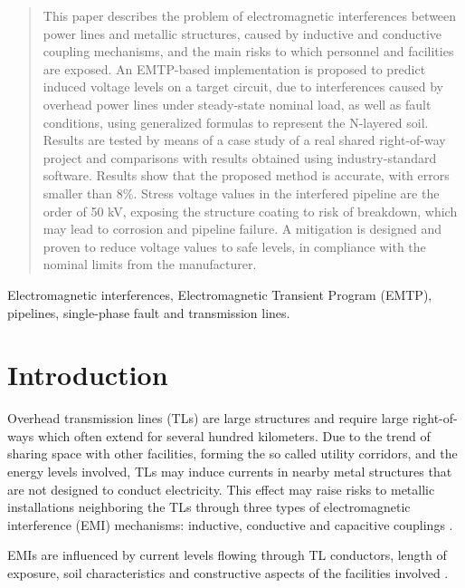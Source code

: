 \documentclass{IEEEtran4PSCC}
\begin{document}
\begin{abstract}
This paper describes the problem of electromagnetic interferences between power lines and metallic structures, caused by inductive and conductive coupling mechanisms, and the main risks to which personnel and facilities are exposed. An EMTP-based implementation is proposed to predict induced voltage levels on a target circuit, due to interferences caused by overhead power lines under steady-state nominal load, as well as fault conditions, using generalized formulas to represent the N-layered soil. Results are tested by means of a case study of a real shared right-of-way project and comparisons with results obtained using industry-standard software. Results show that the proposed method is accurate, with errors smaller than 8\%. Stress voltage values in the interfered pipeline are the order of 50 kV, exposing the structure  coating to risk of breakdown, which may lead to corrosion and pipeline failure. A mitigation is designed and proven to reduce voltage values to safe levels, in compliance with the nominal limits from the manufacturer.
\end{abstract}

\begin{IEEEkeywords}
Electromagnetic interferences, Electromagnetic Transient Program (EMTP), pipelines, single-phase fault and transmission lines.
\end{IEEEkeywords}





\section{Introduction}


Overhead transmission lines (TLs) are large structures and
require large right-of-ways which often extend for several hundred kilometers. Due to the trend of sharing space with other facilities, forming the so called utility corridors, and the energy levels involved,  TLs may induce currents in nearby metal structures that are not designed to conduct electricity. This effect may raise risks to metallic installations neighboring the TLs through three types of electromagnetic interference (EMI) mechanisms: inductive, conductive and capacitive couplings \cite{CIGREWG36}.

EMIs are influenced by current levels flowing through TL conductors, length of exposure, soil characteristics and constructive aspects of the facilities involved \cite{CIGREWG36}. 
\end{document}
